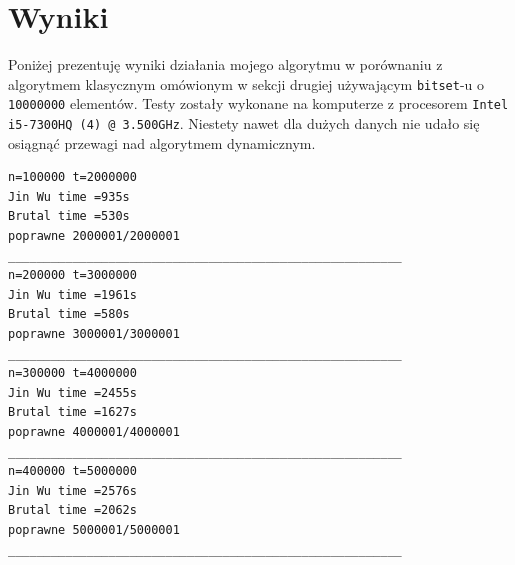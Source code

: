 \documentclass{article}
\begin{document}
\section{Wyniki}
Poniżej prezentuję wyniki działania mojego algorytmu w porównaniu z algorytmem klasycznym omówionym w sekcji drugiej
używającym \texttt{bitset}-u o \texttt{10000000} elementów.
Testy zostały wykonane na komputerze z procesorem \texttt{Intel i5-7300HQ (4) @ 3.500GHz}. Niestety nawet dla dużych
danych nie udało się osiągnąć przewagi nad algorytmem dynamicznym.

\begin{verbatim}
n=100000 t=2000000
Jin Wu time =935s
Brutal time =530s
poprawne 2000001/2000001
_______________________________________________________
n=200000 t=3000000
Jin Wu time =1961s
Brutal time =580s
poprawne 3000001/3000001
_______________________________________________________
n=300000 t=4000000
Jin Wu time =2455s
Brutal time =1627s
poprawne 4000001/4000001
_______________________________________________________
n=400000 t=5000000
Jin Wu time =2576s
Brutal time =2062s
poprawne 5000001/5000001
_______________________________________________________
\end{verbatim}
    


\end{document}
